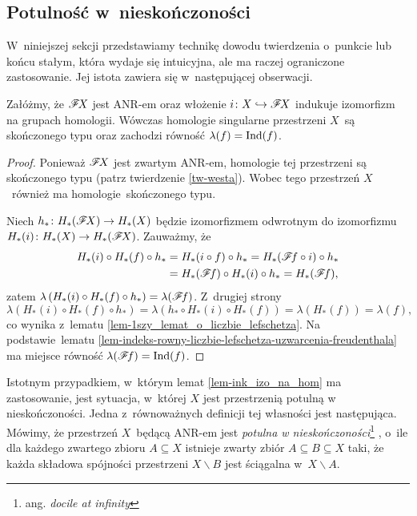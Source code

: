 

\subsection{Potulność w~nieskończoności}
W~niniejszej sekcji przedstawiamy technikę dowodu twierdzenia o~punkcie lub końcu stałym, która wydaje się intuicyjna, ale ma raczej ograniczone zastosowanie. Jej istota zawiera się w~następującej obserwacji.

\begin{lem}\label{lem-ink_izo_na_hom}
Załóżmy, że $\mathscr{F}\! X$ jest \mbox{ANR-em} oraz włożenie $i\colon X\hookrightarrow \mathscr{F}\! X$ indukuje izomorfizm na grupach homologii. Wówczas homologie singularne przestrzeni $X$~są skończonego typu oraz zachodzi równość $\lambda(f)=\operatorname{Ind}(f)$.
\end{lem}
\begin{proof}
Ponieważ $\mathscr{F}\! X$ jest zwartym {ANR-em}, homologie tej przestrzeni są skończonego typu (patrz twierdzenie \ref{tw-westa}). Wobec tego przestrzeń $X$~również ma homologie~skończonego typu.

Niech $h_*\colon H_*(\mathscr{F}\! X)\to H_*(X)$ będzie izomorfizmem odwrotnym do izomorfizmu $H_*(i)\colon H_*(X)\to H_*(\mathscr{F}\! X)$. Zauważmy, że \begin{align*}H_*(i)\circ H_*(f)\circ h_*&=H_*(i\circ f)\circ h_*=H_*(\mathscr{F}\! f\circ i)\circ h_*\\&=H_*(\mathscr{F}\! f)\circ H_*(i)\circ h_*= H_*(\mathscr{F}\! f),\end{align*} zatem $\lambda\left(H_*(i)\circ H_*(f)\circ h_*\right)=\lambda(\mathscr{F}\! f)$. Z~drugiej strony \[\lambda(H_*(i)\circ H_*(f)\circ h_*)=\lambda(h_*\circ H_*(i)\circ H_*(f))=\lambda(H_*(f))=\lambda(f),\] co wynika z~lematu \ref{lem-1szy_lemat_o_liczbie_lefschetza}. Na podstawie~lematu \ref{lem-indeks-rowny-liczbie-lefschetza-uzwarcenia-freudenthala} ma miejsce równość $\lambda(\mathscr{F}\! f)=\operatorname{Ind}(f)$.\end{proof}

Istotnym przypadkiem, w~którym lemat \ref{lem-ink_izo_na_hom} ma zastosowanie, jest sytuacja, w~której $X$ jest przestrzenią potulną w nieskończoności. Jedna z~równoważnych definicji tej własności jest następująca. Mówimy, że przestrzeń $X$~będącą \mbox{ANR-em} jest \textit{potulna w nieskończoności}\footnote{ang. \textit{docile at infinity}}  \cite{Sher76}, o~ile dla każdego zwartego zbioru $A\subseteq X$ istnieje zwarty zbiór $A\subseteq B\subseteq X$ taki, że każda składowa spójności przestrzeni $X\smallsetminus B$ jest ściągalna w~$X\smallsetminus A$.

